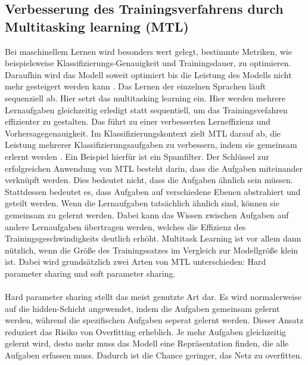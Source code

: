 \subsection{Verbesserung des Trainingsverfahrens durch Multitasking learning (MTL)}
 Bei maschinellem Lernen wird besonders wert gelegt, bestimmte Metriken, wie beispielsweise Klassifizierungs-Genauigkeit und Trainingsdauer, zu optimieren. Daraufhin wird das Modell soweit optimiert bis die Leistung des Modells nicht mehr gesteigert werden kann \cite{Ruder.2017}. Das Lernen  der einzelnen Sprachen läuft sequenziell ab. Hier setzt das multitasking learning ein.  Hier werden mehrere Lernaufgaben gleichzeitig erledigt statt sequentiell, um das Trainingsvefahren effizienter zu gestalten. Das führt zu einer verbesserten Lerneffizienz und Vorhersagegenauigkeit. Im Klassifizierungskontext zielt MTL darauf ab, die Leistung mehrerer Klassifizierungsaufgaben zu verbessern, indem sie gemeinsam erlernt werden \cite{Lu_multitasklearning}. Ein Beispiel hierfür ist ein Spamfilter. Der Schlüssel zur erfolgreichen Anwendung von MTL besteht darin, dass die Aufgaben miteinander verknüpft werden. Dies bedeutet nicht, dass die Aufgaben ähnlich sein müssen. Stattdessen bedeutet es, dass Aufgaben auf verschiedene Ebenen  abstrahiert und geteilt werden. Wenn die Lernaufgaben tatsächlich ähnlich sind, können sie gemeinsam zu gelernt werden. Dabei kann das Wissen zwischen Aufgaben auf andere Lernaufgaben übertragen werden, welches die Effizienz des Trainingsgeschwindigkeits deutlich erhöht. Multitask Learning ist vor allem dann nützlich, wenn die Größe des Trainingssatzes im Vergleich zur Modellgröße klein ist. Dabei wird grundsätzlich zwei Arten von MTL unterschieden: Hard parameter sharing und soft parameter sharing. \\ \\ Hard parameter sharing stellt das meist genutzte Art dar\cite{Ruder.2017}. Es wird normalerweise auf die hidden-Schicht angewendet, indem die Aufgaben gemeinsam gelernt werden, während die spezifischen Aufgaben seperat gelernt werden. Dieser Ansatz reduziert das Risiko von Overfitting erheblich. Je mehr Aufgaben gleichzeitig gelernt wird, desto mehr muss das Modell eine Repräsentation finden, die alle Aufgaben erfassen muss. Dadurch ist die Chance geringer, das Netz zu overfitten.
